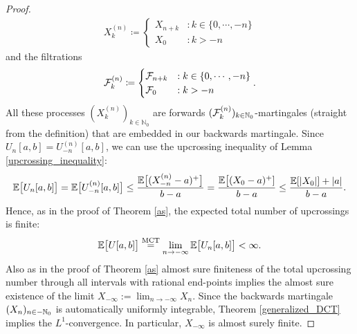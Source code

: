 \begin{proof}[Proof]
	\begin{align*}
		X_k^{(n)} \coloneqq \begin{cases}
					X_{n+k} &: k\in\{0,\cdots , -n \} \\
					X_0 &: k> -n \end{cases}
	\end{align*}
	and the filtrations 
	\begin{align*}
		\mathcal{F}_k^{(n)} \coloneqq \begin{cases}
								\mathcal{F}_{n+k} &: k\in\{0,\cdots , -n \} \\
								\mathcal{F}_0 &: k > -n \end{cases}.
	\end{align*}
	All these processes $(X_k^{(n)})_{k\in\mathbb{N}_0}$ are forwards $(\mathcal{F}_k^{(n)})_{k\in\mathbb{N}_0}$-martingales (straight from the definition) that are embedded in our backwards martingale. %
	Since $U_{n}[a,b] = U_{-n}^{(n)}[a,b]$, we can use the upcrossing inequality of Lemma \ref{upcrossing_inequality}:
	\begin{align*}
		\mathbb{E}\big[ U_{n}[a,b] \big]=\mathbb{E}\big[ U^{(n)}_{-n}[a,b] \big] \leq \frac{\mathbb{E}\big[(X_{-n}^{(n)}-a)^+\big]}{b-a} = \frac{\mathbb{E}\big[(X_0 - a)^+]}{b-a} \leq \frac{\mathbb{E}[\lvert X_0 \rvert]+ \lvert a \rvert}{b-a}.
	\end{align*}
	Hence, as in the proof of Theorem \ref{as}, the expected total number of upcrossings is finite:
	\begin{align*}
		\mathbb{E} \big[ U[a,b]\big] \overset{\text{MCT}}{=} \lim\limits_{n \to -\infty}\mathbb{E}\big[ U_{n}[a,b] \big] < \infty.
	\end{align*}
	Also as in the proof of Theorem \ref{as} almost sure finiteness of the total upcrossing number through all intervals with rational end-points implies the almost sure existence of the limit $X_{-\infty}:= \lim_{n\to -\infty}X_n$. Since the backwards martingale $(X_n)_{n\in-\mathbb{N}_0}$ is automatically uniformly integrable, Theorem \ref{generalized_DCT} implies the $L^1$-convergence. In particular, $X_{-\infty}$ is almost surely finite. \smallskip
	

\end{proof}

